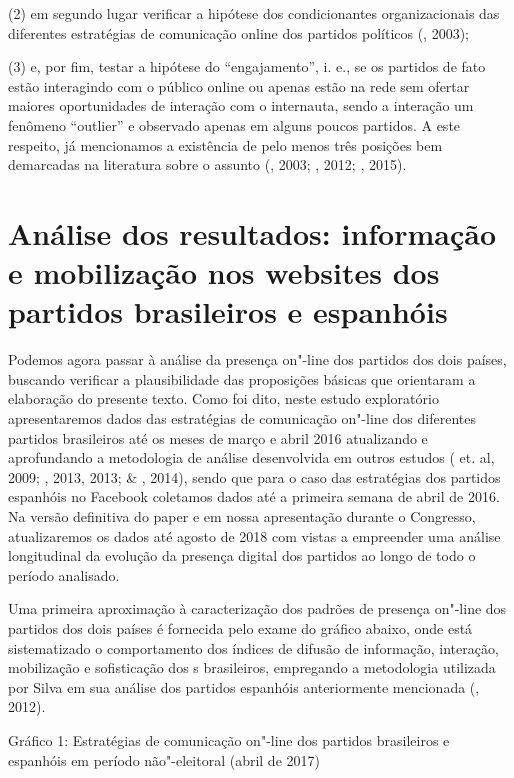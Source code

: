 (2) em segundo lugar verificar a hipótese dos condicionantes
organizacionais das diferentes estratégias de comunicação online dos
partidos políticos (, 2003);

(3) e, por fim, testar a hipótese do ``engajamento'', i. e., se os
partidos de fato estão interagindo com o público online ou apenas estão
na rede sem ofertar maiores oportunidades de interação com o internauta,
sendo a interação um fenômeno ``outlier'' e observado apenas em alguns
poucos partidos. A este respeito, já mencionamos a existência de pelo
menos três posições bem demarcadas na literatura sobre o assunto
(, 2003; , 2012; , 2015).

\section{Análise dos resultados: informação e mobilização nos websites dos
partidos brasileiros e espanhóis}

Podemos agora passar à análise da presença on"-line dos partidos dos dois
países, buscando verificar a plausibilidade das proposições básicas que
orientaram a elaboração do presente texto. Como foi dito, neste estudo
exploratório apresentaremos dados das estratégias de comunicação on"-line
dos diferentes partidos brasileiros até os meses de março e abril 2016
atualizando e aprofundando a metodologia de análise desenvolvida em
outros estudos ( et. al, 2009; , 2013, 2013;  \& ,
2014), sendo que para o caso das estratégias dos partidos espanhóis no
Facebook coletamos dados até a primeira semana de abril de 2016. Na
versão definitiva do paper e em nossa apresentação durante o Congresso,
atualizaremos os dados até agosto de 2018 com vistas a empreender uma
análise longitudinal da evolução da presença digital dos partidos ao
longo de todo o período analisado.

Uma primeira aproximação à caracterização dos padrões de presença
on"-line dos partidos dos dois países é fornecida pelo exame do gráfico
abaixo, onde está sistematizado o comportamento dos índices de difusão
de informação, interação, mobilização e sofisticação dos s
brasileiros, empregando a metodologia utilizada por Silva em sua análise
dos partidos espanhóis anteriormente mencionada (, 2012).

Gráfico 1: Estratégias de comunicação on"-line dos partidos brasileiros e
espanhóis em período não"-eleitoral (abril de 2017)

